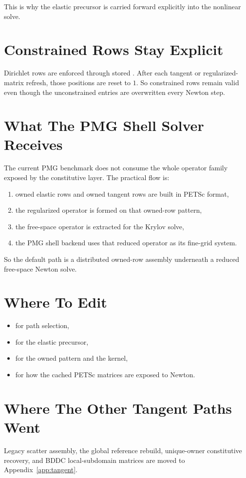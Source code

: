 This is why the elastic precursor is carried forward explicitly into the
nonlinear solve.

\section{Constrained Rows Stay Explicit}

Dirichlet rows are enforced through stored
. After each tangent or regularized-matrix
refresh, those positions are reset to \(1\). So constrained rows remain valid
even though the unconstrained entries are overwritten every Newton step.

\section{What The PMG Shell Solver Receives}

The current PMG benchmark does not consume the whole operator family exposed by
the constitutive layer. The practical flow is:
\begin{enumerate}
\item owned elastic rows and owned tangent rows are built in PETSc format,
\item the regularized operator is formed on that owned-row pattern,
\item the free-space operator is extracted for the Krylov solve,
\item the PMG shell backend uses that reduced operator as its fine-grid system.
\end{enumerate}

So the default path is a distributed owned-row assembly underneath a reduced
free-space Newton solve.

\section{Where To Edit}

\begin{itemize}
\item {} for path selection,
\item {} for the elastic precursor,
\item {} for the owned pattern and the
 kernel,
\item {} for how the cached PETSc matrices are
exposed to Newton.
\end{itemize}

\section{Where The Other Tangent Paths Went}

Legacy scatter assembly, the global reference rebuild, unique-owner
constitutive recovery, and BDDC local-subdomain matrices are moved to
Appendix~\ref{app:tangent}.
